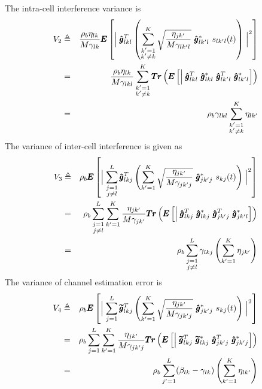 \documentclass[10pt, a4paper, twoside,fleqn]{article}
\begin{document}
The intra-cell interference variance is
\begin{eqnarray}\label{eq:noiseF2}
	V_2 &\triangleq& \frac{\rho_b\eta_{lk}}{M\gamma_{lk}} \pmb{E}\left[\Bigm| \pmb{\hat g}^T_{lkl}  \left(\sum_{\substack{k'=1 \\ k' \neq k}}^{K} \sqrt{\frac{\eta_{jk'}}{M\gamma_{lk'l}}} \ \pmb{\hat g}^*_{lk'l} \ s_{lk'l} (t)\right)\Bigm|^2\right] \nonumber \\
        &=& \frac{\rho_b\eta_{lk}}{M\gamma_{lkl}} \sum_{\substack{k'=1 \\ k' \neq k}}^{K} \pmb{Tr}\left(\pmb{E}\left[\Bigm| \pmb{\hat g}^T_{lkl} \ \pmb{\hat g}_{lkl}^* \ \pmb{\hat g}^T_{lk'l} \ \pmb{\hat g}_{lk'l}^{*} \right]\right) \nonumber \\
	    &=&  \rho_b\gamma_{lkl}\sum\limits_{\substack{k'=1\\ k'\neq k}}^{K}\eta_{lk'}
\end{eqnarray}
The variance of inter-cell interference is given as
\begin{eqnarray}\label{eq:noiseF3}
	V_3 &\triangleq& \rho_b \pmb{E}\left[\Bigm|\sum_{\substack{j=1 \\ j \neq l}}^{L} \pmb{\hat g}_{lkj}^T \left(\sum_{k'=1}^{K} \sqrt{\frac{\eta_{jk'}}{M\gamma_{jk'j}}} \ \pmb{\hat g}^*_{jk'j} \ s_{kj} (t)\right)\Bigm|^2\right] \nonumber \\ 
    &=& \rho_b\sum_{\substack{j=1 \\ j \neq l}}^{L} \sum_{k'=1}^{K} \frac{\eta_{jk'}}{M\gamma_{jk'}} \pmb{Tr}\left(\pmb{E}\left[\Bigm| \pmb{\hat g}_{lkj}^T \ \pmb{\hat g}_{lkj}^* \ \pmb{\hat g}_{jk'j}^T \ \pmb{\hat g}_{jk'l}^{*} \right]\right) \nonumber \\
    &=& \rho_b\sum_{\substack{j=1 \\ j \neq l}}^{L}\gamma_{lkj}\left(\sum_{k'=1}^{K}\eta_{jk'}\right)
\end{eqnarray}
The variance of channel estimation error is
\begin{eqnarray}\label{eqn:noiseF4}
	V_4 &\triangleq& \rho_b \pmb{E} \left[ \Bigm |\sum_{j=1}^{L} \pmb{\widetilde{g}}_{lkj}^T \left(\sum_{k'=1}^{K} \sqrt{\frac{\eta_{jk'}}{M\gamma_{jk'j}}} \ \pmb{\hat g}^*_{jk'j} \ s_{kj} (t)\right)\Bigm|^2 \right] \nonumber \\
     &=& \rho_b\sum_{j=1}^{L} \sum_{k'=1}^{K} \frac{\eta_{jk'}}{M\gamma_{jk'j}} \pmb{Tr}\left(\pmb{E}\left[\Bigm| \pmb{\widetilde{g}}^T_{lkj} \ \pmb{\widetilde{g}}_{lkj}^* \ \pmb{\hat g}_{jk'j}^T \ \pmb{\hat g}_{jk'j}^{*} \right]\right) \nonumber \\
        &=& \rho_b\sum\limits_{j'=1}^{L}(\beta_{lk}-\gamma_{lk})\left(\sum\limits_{k'=1}^{K}\eta_{lk'}\right)
\end{eqnarray}
\end{document}
